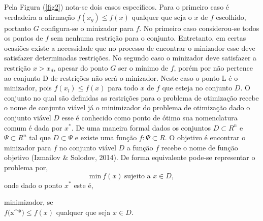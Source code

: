 \documentclass[12pt,fleqn]{article}
\begin{document}
Pela Figura (\ref{fig2}) nota-se dois casos espec\'ificos. Para o primeiro caso \'e verdadeira a afirma\c c\~ao $f(x_g)
\leq f(x)$ qualquer que seja o $x$ de $f$ escolhido, portanto $G$ configura-se o minizador para
$f$. No primeiro caso considerou-se todos os pontos de $f$ sem nenhuma restri\c c\~ao para o conjunto. Entretanto, em
certas ocasi\~oes existe a  necessidade que no processo de encontrar o minizador
esse deve satisfazer  determinadas restri\c c\~oes. No segundo caso o minizador deve satisfazer a restri\c c\~ao $x > x_d$, apesar do ponto
$G$ ser o m\'inimo de $f$, por\'em por n\~ao pertence ao conjunto D de restri\c c\~oes n\~ao ser\'a o minizador. Neste
caso o ponto L \'e o minizador, pois $f(x_l) \leq f(x)$ para todo $x$ de $f$ que esteja no conjunto
$D$. O conjunto no qual s\~ao definidas as restri\c c\~oes para o problema de otimiza\c c\~ao recebe o nome
de conjunto vi\'avel j\'a o minimizador do problema de
otimiza\c c\~ao dado o conjunto vi\'avel $D$ esse \'e conhecido como ponto de \'otimo sua nomenclatura comum \'e dada por ${x}^{*}$. De uma maneira formal  dados os conjuntos $D \subset {R}^{n}$ e $\Psi \subset {R}^{n}$ tal que $D
\subset \Psi $ e existe uma fun\c c\~ao $f: \Psi \subset R$. O objetivo \'e encontrar o minizador para
$f$ no conjunto  vi\'avel $D$ a fun\c c\~ao $f$ recebe o nome de fun\c c\~ao objetivo (Izmailov \& Solodov, 2014). De forma equivalente pode-se
representar o problema por,
\begin{equation}
  \text{min} \ f(x) \ \text{sujeito a $x \in D$},
  \label {min1}
\end{equation}
onde dado o ponto ${x}^{*}$ este \'e,
\begin{description}
  \item minimizador, se \\
	  $f(${x}^{*}$) \leq f(x) $ qualquer que seja $x \in D$. 
	\end{description}
\end{document}
